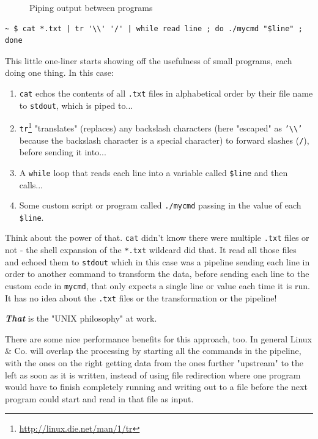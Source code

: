 \documentclass[10pt,]{book}
\renewcommand{\href}[2]{#2\footnote{\url{#1}}}
\numberwithin{figure}{chapter}
\DeclareRobustCommand{\drcap}[1]{\begin{figure}[H]\caption{#1}\end{figure}}
\DeclareRobustCommand{\drcmd}[1]{\index{Commands!#1}}
\begin{document}
\drcap{Piping output between programs}

\begin{verbatim}
~ $ cat *.txt | tr '\\' '/' | while read line ; do ./mycmd "$line" ; done
\end{verbatim}

This little one-liner starts showing off the usefulness of small
programs, each doing one thing. In this case:

\begin{enumerate}
\def\labelenumi{\arabic{enumi}.}
\item
  \texttt{cat} echos the contents of all \texttt{.txt} files in
  alphabetical order by their file name to \texttt{stdout}, which is
  piped to...
\item
  \href{http://linux.die.net/man/1/tr}{\texttt{tr}}\drcmd{tr}
  "translates" (replaces) any backslash characters (here "escaped" as
  \texttt{'\textbackslash{}\textbackslash{}'} because the backslash
  character is a special character) to forward slashes (\texttt{/}),
  before sending it into...
\item
  A \texttt{while}\drcmd{while} loop that reads each line into a
  variable called \texttt{\$line} and then calls...
\item
  Some custom script or program called \texttt{./mycmd} passing in the
  value of each \texttt{\$line}.
\end{enumerate}

Think about the power of that. \texttt{cat} didn't know there were
multiple \texttt{.txt} files or not - the shell expansion of the
\texttt{*.txt} wildcard did that. It read all those files and echoed
them to \texttt{stdout} which in this case was a pipeline sending each
line in order to another command to transform the data, before sending
each line to the custom code in \texttt{mycmd}, that only expects a
single line or value each time it is run. It has no idea about the
\texttt{.txt} files or the transformation or the pipeline!

\textbf{\emph{That}} is the "UNIX philosophy" at work.

There are some nice performance benefits for this approach, too. In
general Linux \& Co. will overlap the processing by starting all the
commands in the pipeline, with the ones on the right getting data from
the ones further "upstream" to the left as soon as it is written,
instead of using file redirection where one program would have to finish
completely running and writing out to a file before the next program
could start and read in that file as input.
\end{document}
